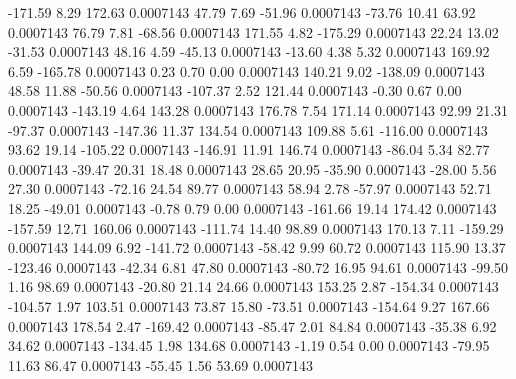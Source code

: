      -171.59        8.29      172.63     0.0007143
       47.79        7.69      -51.96     0.0007143
      -73.76       10.41       63.92     0.0007143
       76.79        7.81      -68.56     0.0007143
      171.55        4.82     -175.29     0.0007143
       22.24       13.02      -31.53     0.0007143
       48.16        4.59      -45.13     0.0007143
      -13.60        4.38        5.32     0.0007143
      169.92        6.59     -165.78     0.0007143
        0.23        0.70        0.00     0.0007143
      140.21        9.02     -138.09     0.0007143
       48.58       11.88      -50.56     0.0007143
     -107.37        2.52      121.44     0.0007143
       -0.30        0.67        0.00     0.0007143
     -143.19        4.64      143.28     0.0007143
      176.78        7.54      171.14     0.0007143
       92.99       21.31      -97.37     0.0007143
     -147.36       11.37      134.54     0.0007143
      109.88        5.61     -116.00     0.0007143
       93.62       19.14     -105.22     0.0007143
     -146.91       11.91      146.74     0.0007143
      -86.04        5.34       82.77     0.0007143
      -39.47       20.31       18.48     0.0007143
       28.65       20.95      -35.90     0.0007143
      -28.00        5.56       27.30     0.0007143
      -72.16       24.54       89.77     0.0007143
       58.94        2.78      -57.97     0.0007143
       52.71       18.25      -49.01     0.0007143
       -0.78        0.79        0.00     0.0007143
     -161.66       19.14      174.42     0.0007143
     -157.59       12.71      160.06     0.0007143
     -111.74       14.40       98.89     0.0007143
      170.13        7.11     -159.29     0.0007143
      144.09        6.92     -141.72     0.0007143
      -58.42        9.99       60.72     0.0007143
      115.90       13.37     -123.46     0.0007143
      -42.34        6.81       47.80     0.0007143
      -80.72       16.95       94.61     0.0007143
      -99.50        1.16       98.69     0.0007143
      -20.80       21.14       24.66     0.0007143
      153.25        2.87     -154.34     0.0007143
     -104.57        1.97      103.51     0.0007143
       73.87       15.80      -73.51     0.0007143
     -154.64        9.27      167.66     0.0007143
      178.54        2.47     -169.42     0.0007143
      -85.47        2.01       84.84     0.0007143
      -35.38        6.92       34.62     0.0007143
     -134.45        1.98      134.68     0.0007143
       -1.19        0.54        0.00     0.0007143
      -79.95       11.63       86.47     0.0007143
      -55.45        1.56       53.69     0.0007143
